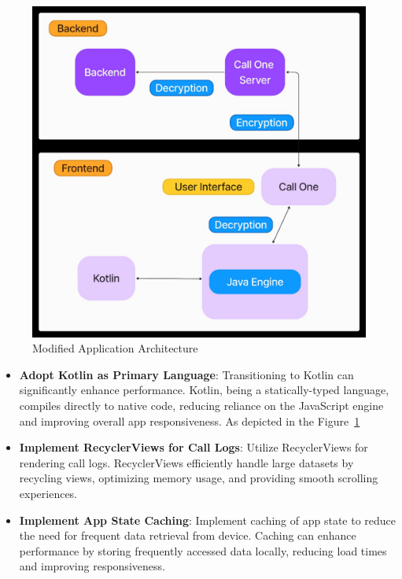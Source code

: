 \begin{figure}
    \centering
    \includegraphics[width=1\linewidth]{Media//Chapter 4//app_arch}
    \caption{Modified Application Architecture}
    \label{fig:Modified Application Architecture}
\end{figure}

\begin{itemize}
    \item \textbf{Adopt Kotlin as Primary Language}: Transitioning to Kotlin can significantly enhance performance.
    Kotlin, being a statically-typed language, compiles directly to native code, reducing reliance on the JavaScript engine and improving overall app responsiveness.
    As depicted in the Figure~\ref{fig:Modified Application Architecture}

    \item \textbf{Implement RecyclerViews for Call Logs}: Utilize RecyclerViews for rendering call logs.
    RecyclerViews efficiently handle large datasets by recycling views, optimizing memory usage, and providing smooth scrolling experiences.

    \item \textbf{Implement App State Caching}: Implement caching of app state to reduce the need for frequent data retrieval from device.
    Caching can enhance performance by storing frequently accessed data locally, reducing load times and improving responsiveness.
\end{itemize}

